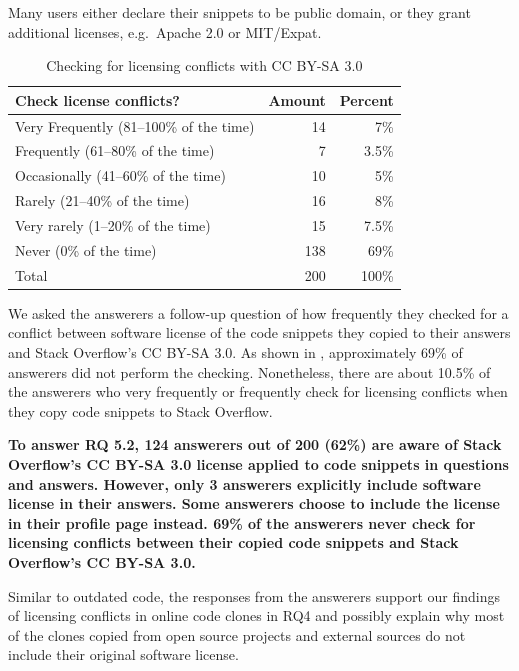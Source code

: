 \documentclass[10pt,journal,compsoc]{IEEEtran}
\begin{document}
Many users either declare their snippets to be public domain, or they grant
additional licenses, e.g.\ Apache 2.0 or MIT/Expat.

\begin{table}
	\centering
	\caption{Checking for licensing conflicts with CC BY-SA 3.0}
	\label{tab:survey_license_check}
	\begin{tabular}{lrr}
		\toprule
		Check license conflicts? & Amount & Percent \\
		\midrule
		Very Frequently (81--100\% of the time)	& 14 & 7\% \\
		Frequently (61--80\% of the time) & 7 & 3.5\% \\
		Occasionally (41--60\% of the time) & 10 & 5\% \\
		Rarely (21--40\% of the time) & 16 & 8\% \\
		Very rarely (1--20\% of the time) & 15 & 7.5\% \\
		Never (0\% of the time) & 138 & 69\% \\
		\midrule
		Total & 200 & 100\% \\
		\bottomrule
	\end{tabular}
\end{table}

We asked the answerers a follow-up question of how frequently they checked for a
conflict between software license of the code snippets they copied to their
answers and Stack Overflow's CC BY-SA 3.0. As shown in
, approximately 69\% of answerers did not perform
the checking. Nonetheless, there are about 10.5\% of the answerers who very
frequently or frequently check for licensing conflicts when they copy code
snippets to Stack Overflow.

\textbf{To answer RQ 5.2, 124 answerers out of 200 (62\%) are aware of Stack Overflow's
CC BY-SA 3.0 license applied to code snippets in questions and answers. However,
only 3 answerers explicitly include software license in their answers. Some 
answerers choose to include the license in their profile page instead. 69\% of the
answerers never check for licensing conflicts between their copied code snippets
and Stack Overflow's CC BY-SA 3.0.}

Similar to outdated code, the responses from the answerers support our findings
of licensing conflicts in online code clones in RQ4 and possibly explain why most of
the clones copied from open source projects and external sources do not include
their original software license.
\end{document}
